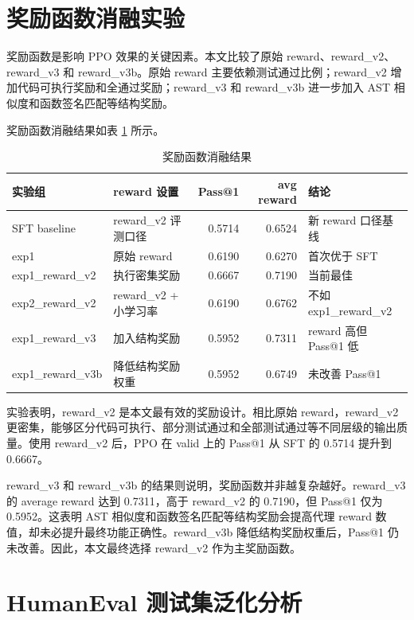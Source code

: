 \section{奖励函数消融实验}

奖励函数是影响 PPO 效果的关键因素。本文比较了原始 reward、reward\_v2、reward\_v3 和 reward\_v3b。原始 reward 主要依赖测试通过比例；reward\_v2 增加代码可执行奖励和全通过奖励；reward\_v3 和 reward\_v3b 进一步加入 AST 相似度和函数签名匹配等结构奖励。

奖励函数消融结果如表 \ref{tab:reward-ablation} 所示。

\begin{table}[!htp]
  \centering
  \caption{奖励函数消融结果}
  \label{tab:reward-ablation}
  \begin{tabular}{llrrl}
    \toprule
    实验组 & reward 设置 & Pass@1 & avg reward & 结论 \\
    \midrule
    SFT baseline & reward\_v2 评测口径 & 0.5714 & 0.6524 & 新 reward 口径基线 \\
    exp1 & 原始 reward & 0.6190 & 0.6270 & 首次优于 SFT \\
    exp1\_reward\_v2 & 执行密集奖励 & 0.6667 & 0.7190 & 当前最佳 \\
    exp2\_reward\_v2 & reward\_v2 + 小学习率 & 0.6190 & 0.6762 & 不如 exp1\_reward\_v2 \\
    exp1\_reward\_v3 & 加入结构奖励 & 0.5952 & 0.7311 & reward 高但 Pass@1 低 \\
    exp1\_reward\_v3b & 降低结构奖励权重 & 0.5952 & 0.6749 & 未改善 Pass@1 \\
    \bottomrule
  \end{tabular}
\end{table}

实验表明，reward\_v2 是本文最有效的奖励设计。相比原始 reward，reward\_v2 更密集，能够区分代码可执行、部分测试通过和全部测试通过等不同层级的输出质量。使用 reward\_v2 后，PPO 在 valid 上的 Pass@1 从 SFT 的 0.5714 提升到 0.6667。

reward\_v3 和 reward\_v3b 的结果则说明，奖励函数并非越复杂越好。reward\_v3 的 average reward 达到 0.7311，高于 reward\_v2 的 0.7190，但 Pass@1 仅为 0.5952。这表明 AST 相似度和函数签名匹配等结构奖励会提高代理 reward 数值，却未必提升最终功能正确性。reward\_v3b 降低结构奖励权重后，Pass@1 仍未改善。因此，本文最终选择 reward\_v2 作为主奖励函数。

\section{HumanEval 测试集泛化分析}

